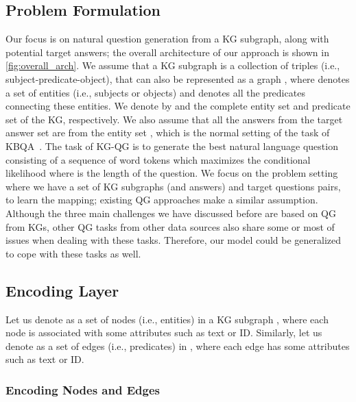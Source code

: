 \documentclass[journal]{IEEEtran}
\begin{document}
\subsection{Problem Formulation}

Our focus is on natural question generation from a KG subgraph, along with potential target answers; the overall architecture of our approach is shown in \cref{fig:overall_arch}. 
We assume that a KG subgraph is a collection of triples (i.e., subject-predicate-object), that can also be represented as a graph ,
where  denotes a set of entities (i.e., subjects or objects) 
and  denotes all the predicates connecting these entities.
We denote by  and  the complete entity set and predicate set of the KG, respectively.
We also assume that all the answers from the target answer set  are from the entity set , which is the normal setting of the task of KBQA~\cite{chen2019bidirectional}.
The task of KG-QG is to generate the best natural language question consisting of a sequence of word tokens  which maximizes the conditional likelihood
 where
 is the length of the question.
We focus on the problem setting where we have a set of KG subgraphs (and answers) and target questions pairs, to learn the mapping; existing QG approaches \cite{serban2016generating,elsahar2018zero,kumar2019difficulty} make a similar assumption. 
Although the three main challenges we have discussed before are based on QG from KGs, other QG tasks from other data sources also share some or most of issues when dealing with these tasks. Therefore, our model could be generalized to cope with these tasks as well.


\subsection{Encoding Layer}

Let us denote  as a set of nodes (i.e., entities)  in a KG subgraph , where each node is associated with some attributes such as text or ID.
Similarly, let us denote  as a set of edges (i.e., predicates)  in , where each edge has some attributes such as text or ID.



\subsubsection{Encoding Nodes and Edges}
\end{document}
